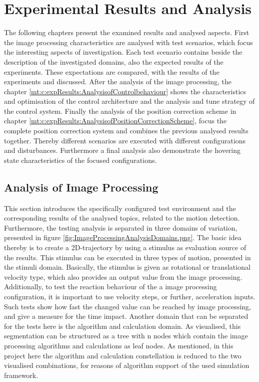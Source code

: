 
\chapter{Experimental Results and Analysis}
\label{mt:c:expResults}

The following chapters present the examined results and analysed aspects. First the image processing characteristics are analysed with test scenarios, which focus the interesting aspects of investigation. Each test scenario contains beside the description of the investigated domains, also the expected results of the experiments.
These expectations are compared, with the results of the experiments and discussed. After the analysis of the image processing, the chapter 
\ref{mt:c:expResults:AnalysisofControlbehaviour} shows the characteristics and optimisation of the control architecture and the analysis and tune strategy of the control system. Finally the analysis of the position correction scheme in chapter 
\ref{mt:c:expResults:AnalysisofPositionCorrectionScheme}, focus the complete position correction system and combines the previous analysed results together. Thereby different scenarios are executed with different configurations and disturbances. Furthermore a final analysis also demonstrate the hovering state characteristics of the focused configurations.

\section{Analysis of Image Processing}
\label{mt:c:expResults:AnalysisofImageProcessing}
This section introduces the specifically configured test environment and the corresponding results of the analysed topics, related to the motion detection. Furthermore, the testing analysis is separated in three domains of variation, presented in figure 
\ref{fig:ImageProcessingAnalysisDomains.png}. The basic idea thereby is to create a 2D-trajectory by using a stimulus as evaluation source of the results. This stimulus can be executed in three types of motion, presented in the stimuli domain. Basically, the stimulus is given as rotational or translational velocity type, which also provides an output value from the image processing. Additionally, to test the reaction behaviour of the a image processing configuration, it is important to use velocity steps, or further, acceleration inputs. Such tests show how fast the changed value can be reached by image processing, and give a measure for the time impact.
Another domain that can be separated for the tests here is the algorithm and calculation domain. As visualised, this segmentation can be structured as a tree with n nodes which contain the image processing algorithms and calculations as leaf nodes. As mentioned, in this project here the algorithm and calculation constellation is reduced to the two visualised combinations, for reasons of algorithm support of the used simulation framework.


